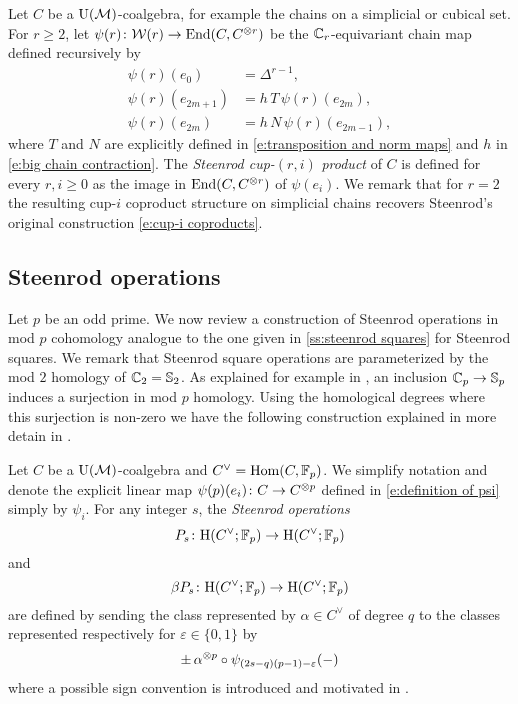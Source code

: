 Let $C$ be a $\operatorname{\mathrm{U}(\mathcal{M})}$-coalgebra, for example the chains on a simplicial or cubical set.
For $r \geq 2$, let $\psi(r) \colon \mathcal{W}(r) \to \mathrm{End}(C, C^{\otimes r})$ be the $\mathbb{C}_r$-equivariant chain map defined recursively by
\begin{equation}\label{e:definition of psi}
	\begin{split}
		\psi(r)(e_0) & = \Delta^{r-1}, \\
		\psi(r)(e_{2m+1}) & = h\,T\,\psi(r)(e_{2m}), \\
		\psi(r)(e_{2m}) & = h\,N\,\psi(r)(e_{2m-1}),
	\end{split}
\end{equation}
where $T$ and $N$ are explicitly defined in \eqref{e:transposition and norm maps} and $h$ in \eqref{e:big chain contraction}.
The \textit{Steenrod cup-}$(r, i)$ \textit{product} of $C$ is defined for every $r, i \geq 0$ as the image in $\mathrm{End}(C, C^{\otimes r})$ of $\psi(e_i)$.
We remark that for $r = 2$ the resulting cup-$i$ coproduct structure on simplicial chains recovers Steenrod's original construction \eqref{e:cup-i coproducts}.

\subsection{Steenrod operations} \label{ss:steenrod operations}

Let $p$ be an odd prime.
We now review a construction of Steenrod operations in mod $p$ cohomology analogue to the one given in \cref{ss:steenrod squares} for Steenrod squares.
We remark that Steenrod square operations are parameterized by the mod $2$ homology of $\mathbb{C}_2 = \mathbb{S}_2$.
As explained for example in \cite[Corollary~VI.1.4]{adem2004milgram}, an inclusion $\mathbb{C}_p \to \mathbb{S}_p$ induces a surjection in mod $p$ homology.
Using the homological degrees where this surjection is non-zero we have the following construction explained in more detain in \cite{steenrod1952reduced, steenrod1953cyclic, steenrod1962cohomology, may1970general}.

Let $C$ be a $\operatorname{\mathrm{U}(\mathcal{M})}$-coalgebra and $C^\vee = \mathrm{Hom}(C, {\mathbb{F}_p})$.
We simplify notation and denote the explicit linear map $\psi(p)(e_i) \colon C \to C^{\otimes p}$ defined in \eqref{e:definition of psi} simply by $\psi_i$.
For any integer $s$, the \textit{Steenrod operations}
\begin{equation*}
	P_s \colon \mathrm{H}(C^\vee; {\mathbb{F}_p}) \to \mathrm{H}(C^\vee; {\mathbb{F}_p})
\end{equation*}
and
\begin{equation*}
	\beta P_s \colon \mathrm{H}(C^\vee; {\mathbb{F}_p}) \to \mathrm{H}(C^\vee; {\mathbb{F}_p})
\end{equation*}
are defined by sending the class represented by $\alpha \in C^\vee$ of degree $q$ to the classes represented respectively for $\varepsilon \in \{0,1\}$ by
\begin{equation*}
	\pm \, \alpha^{\otimes p} \circ \psi_{(2s-q)(p-1)-\varepsilon}(-)
\end{equation*}
where a possible sign convention is introduced and motivated in \cite[(6.1)]{steenrod1953cyclic}.

